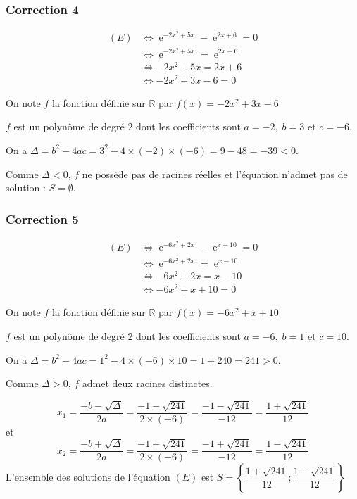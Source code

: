 \documentclass[15pt, mathserif]{beamer}
\DeclareMathOperator{\e}{e}
\newcommand{\R}{\mathbb{R}}			%
\begin{document}
\begin{frame}
\vspace{-10mm}
	\frametitle{Correction 4}
	\begin{align*} (E)& \Leftrightarrow \e^{-2x^2+5x}-\e^{2x+6}=0 \\
		&\Leftrightarrow \e^{-2x^2+5x}=\e^{2x+6} \\
		&\Leftrightarrow -2x^2+5x=2x+6\\
		&\Leftrightarrow -2x^2+3x-6=0 
 \end{align*} 
 
 On note $f$ la fonction définie sur $\R$ par $f(x)=-2x^2+3x-6$ 
 
 $f$ est un polynôme de degré $2$ dont les coefficients sont $a =-2, \; b =3$ et $c =-6$.
 
 On a $\Delta = b^2-4ac =3^2-4 \times\left(-2\right)\times\left(-6\right)=9-48 = -39<0$.


 
 Comme $\Delta <0$, $f$ ne possède pas de racines réelles et l'équation n'admet pas de solution : $S=\emptyset$.\end{frame}


\begin{frame}
\vspace{-10mm}
	\frametitle{Correction 5}
	\begin{align*} (E)& \Leftrightarrow \e^{-6x^2+2x}-\e^{x-10}=0 \\
		&\Leftrightarrow \e^{-6x^2+2x}=\e^{x-10} \\
		&\Leftrightarrow -6x^2+2x=x-10\\
		&\Leftrightarrow -6x^2+x+10=0 
 \end{align*} 
 
 On note $f$ la fonction définie sur $\R$ par $f(x)=-6x^2+x+10$ 
 
 $f$ est un polynôme de degré $2$ dont les coefficients sont $a =-6, \; b =1$ et $c =10$.
 
 On a $\Delta = b^2-4ac =1^2-4 \times\left(-6\right)\times10=1+240 = 241>0$.

 
 \end{frame} 
 
 \begin{frame} 
 

 
 Comme $\Delta > 0$, $f$ admet deux racines distinctes. 

\[x_1 = \dfrac{-b-\sqrt{\Delta}}{2a} = \dfrac{-1-\sqrt{241}}{2 \times \left(-6\right)} = \dfrac{-1-\sqrt{241}}{-12}= \dfrac{1+\sqrt{241}}{12}\] et \[ x_2 = \dfrac{-b+\sqrt{\Delta}}{2a} = \dfrac{-1+\sqrt{241}}{2 \times \left(-6\right)} = \dfrac{-1+\sqrt{241}}{-12}  = \dfrac{1-\sqrt{241}}{12}\] L'ensemble des solutions de l'équation $(E)$ est $S=\left\{ \dfrac{1+\sqrt{241}}{12};\dfrac{1-\sqrt{241}}{12}\right\}$\end{frame}
\end{document}
